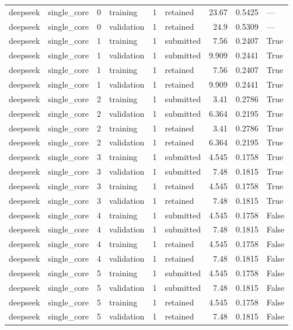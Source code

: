 \begin{tabular}{llrlrlrrl}
deepseek & single\_core & 0 & training & 1 & retained & 23.67 & 0.5425 & — \\
deepseek & single\_core & 0 & validation & 1 & retained & 24.9 & 0.5309 & — \\
deepseek & single\_core & 1 & training & 1 & submitted & 7.56 & 0.2407 & True \\
deepseek & single\_core & 1 & validation & 1 & submitted & 9.909 & 0.2441 & True \\
deepseek & single\_core & 1 & training & 1 & retained & 7.56 & 0.2407 & True \\
deepseek & single\_core & 1 & validation & 1 & retained & 9.909 & 0.2441 & True \\
deepseek & single\_core & 2 & training & 1 & submitted & 3.41 & 0.2786 & True \\
deepseek & single\_core & 2 & validation & 1 & submitted & 6.364 & 0.2195 & True \\
deepseek & single\_core & 2 & training & 1 & retained & 3.41 & 0.2786 & True \\
deepseek & single\_core & 2 & validation & 1 & retained & 6.364 & 0.2195 & True \\
deepseek & single\_core & 3 & training & 1 & submitted & 4.545 & 0.1758 & True \\
deepseek & single\_core & 3 & validation & 1 & submitted & 7.48 & 0.1815 & True \\
deepseek & single\_core & 3 & training & 1 & retained & 4.545 & 0.1758 & True \\
deepseek & single\_core & 3 & validation & 1 & retained & 7.48 & 0.1815 & True \\
deepseek & single\_core & 4 & training & 1 & submitted & 4.545 & 0.1758 & False \\
deepseek & single\_core & 4 & validation & 1 & submitted & 7.48 & 0.1815 & False \\
deepseek & single\_core & 4 & training & 1 & retained & 4.545 & 0.1758 & False \\
deepseek & single\_core & 4 & validation & 1 & retained & 7.48 & 0.1815 & False \\
deepseek & single\_core & 5 & training & 1 & submitted & 4.545 & 0.1758 & False \\
deepseek & single\_core & 5 & validation & 1 & submitted & 7.48 & 0.1815 & False \\
deepseek & single\_core & 5 & training & 1 & retained & 4.545 & 0.1758 & False \\
deepseek & single\_core & 5 & validation & 1 & retained & 7.48 & 0.1815 & False \\

\end{tabular}
